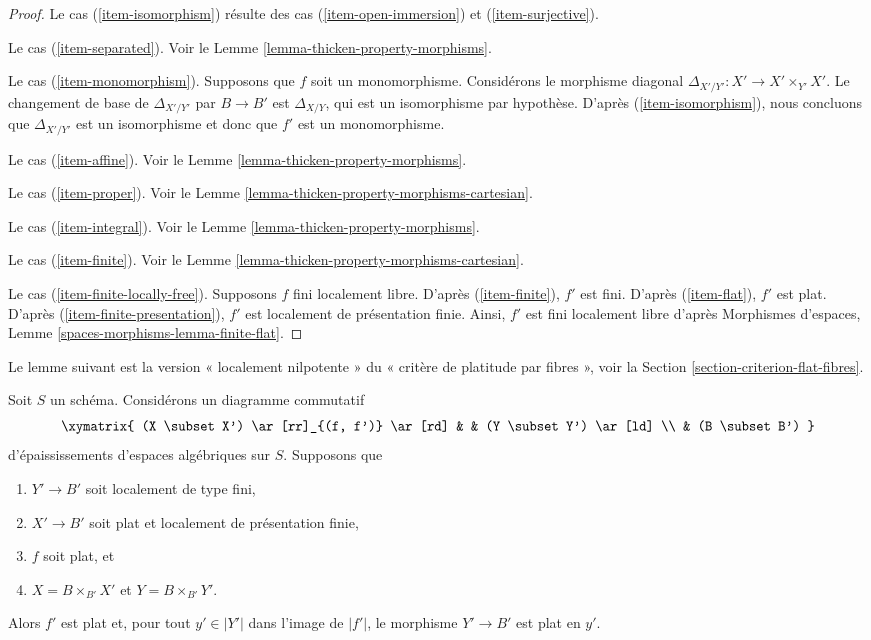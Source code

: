 \begin{proof}
\medskip\noindent
Le cas (\ref{item-isomorphism}) résulte des cas
(\ref{item-open-immersion}) et (\ref{item-surjective}).

\medskip\noindent
Le cas (\ref{item-separated}). Voir le
Lemme \ref{lemma-thicken-property-morphisms}.

\medskip\noindent
Le cas (\ref{item-monomorphism}). Supposons que $f$ soit un monomorphisme.
Considérons le morphisme diagonal $\Delta_{X'/Y'} : X' \to X' \times_{Y'} X'$.
Le changement de base de $\Delta_{X'/Y'}$ par $B \to B'$ est $\Delta_{X/Y}$,
qui est un isomorphisme par hypothèse. D'après (\ref{item-isomorphism}),
nous concluons que $\Delta_{X'/Y'}$ est un isomorphisme et donc que
$f'$ est un monomorphisme.

\medskip\noindent
Le cas (\ref{item-affine}). Voir le Lemme \ref{lemma-thicken-property-morphisms}.

\medskip\noindent
Le cas (\ref{item-proper}). Voir le
Lemme \ref{lemma-thicken-property-morphisms-cartesian}.

\medskip\noindent
Le cas (\ref{item-integral}). Voir le
Lemme \ref{lemma-thicken-property-morphisms}.

\medskip\noindent
Le cas (\ref{item-finite}). Voir le
Lemme \ref{lemma-thicken-property-morphisms-cartesian}.

\medskip\noindent
Le cas (\ref{item-finite-locally-free}). Supposons $f$ fini localement libre.
D'après (\ref{item-finite}), $f'$ est fini.
D'après (\ref{item-flat}), $f'$ est plat.
D'après (\ref{item-finite-presentation}), $f'$ est localement de
présentation finie. Ainsi, $f'$ est fini localement libre d'après
Morphismes d'espaces, Lemme \ref{spaces-morphisms-lemma-finite-flat}.
\end{proof}

\noindent
Le lemme suivant est la version « localement nilpotente » du
« critère de platitude par fibres », voir la
Section \ref{section-criterion-flat-fibres}.

\begin{lemma}
\label{lemma-flatness-morphism-thickenings-fp-over-ft}
Soit $S$ un schéma. Considérons un diagramme commutatif
$$
\xymatrix{
(X \subset X') \ar[rr]_{(f, f')} \ar[rd] & & (Y \subset Y') \ar[ld] \\
& (B \subset B')
}
$$
d'épaississements d'espaces algébriques sur $S$. Supposons que
\begin{enumerate}
\item $Y' \to B'$ soit localement de type fini,
\item $X' \to B'$ soit plat et localement de présentation finie,
\item $f$ soit plat, et
\item $X = B \times_{B'} X'$ et $Y = B \times_{B'} Y'$.
\end{enumerate}
Alors $f'$ est plat et, pour tout $y' \in |Y'|$ dans l'image de $|f'|$,
le morphisme $Y' \to B'$ est plat en $y'$.
\end{lemma}

